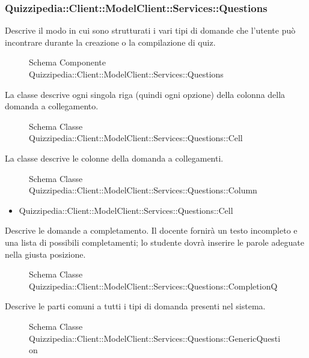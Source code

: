 \subsubsection{Quizzipedia::Client::ModelClient::Services::Questions}
Descrive il modo in cui sono strutturati i vari tipi di domande che l'utente può incontrare durante la creazione o la compilazione di quiz.
\begin{figure}[H]
\centering
\noindent{}
\caption{Schema Componente Quizzipedia::Client::ModelClient::Services::Questions}
\end{figure}
La classe descrive ogni singola riga (quindi ogni opzione) della colonna della domanda a collegamento.
\begin{figure}[H]
\centering
\noindent{}
\caption{Schema Classe Quizzipedia::Client::ModelClient::Services::Questions::Cell}
\end{figure}
La classe descrive le colonne della domanda a collegamenti.
\begin{figure}[H]
\centering
\noindent{}
\caption{Schema Classe Quizzipedia::Client::ModelClient::Services::Questions::Column}
\end{figure}
\begin{itemize}
\item Quizzipedia::Client::ModelClient::Services::Questions::Cell
\end{itemize}
Descrive le domande a completamento. Il docente fornirà un testo incompleto e una lista di possibili completamenti; lo studente dovrà inserire le parole adeguate nella giusta posizione.
\begin{figure}[H]
\centering
\noindent{}
\caption{Schema Classe Quizzipedia::Client::ModelClient::Services::Questions::CompletionQ}
\end{figure}
Descrive le parti comuni a tutti i tipi di domanda presenti nel sistema.
\begin{figure}[H]
\centering
\noindent{}
\caption{Schema Classe Quizzipedia::Client::ModelClient::Services::Questions::GenericQuestion}
\end{figure}

